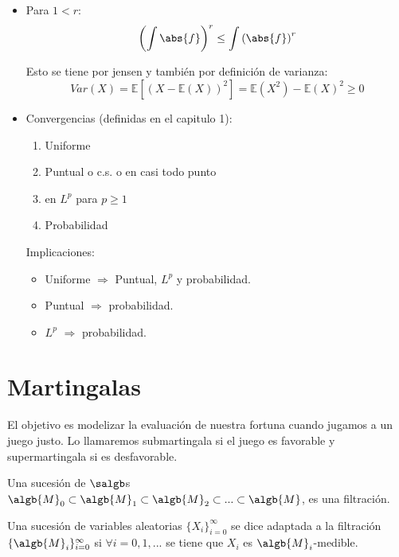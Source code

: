 \documentclass{apuntes}
\begin{document}
\begin{itemize}
\begin{itemize}
\begin{enumerate}
\end{enumerate}


\end{itemize}
\item Para $1<r$:
$$\left(\int \abs{f}\right)^r \leq\int \left( \abs{f} \right)^r$$

Esto se tiene por jensen y también por definición de varianza:
\[
Var(X)=\mathbb{E}[(X-\mathbb{E}(X))^2] = \mathbb{E}(X^2) - \mathbb{E}(X)^2 \geq 0
\]

\item Convergencias (definidas en el capitulo 1):
\begin{enumerate}
\item Uniforme
\item Puntual o c.s. o en casi todo punto
\item en $L^p$ para $p\geq 1$
\item Probabilidad
\end{enumerate}
Implicaciones:
\begin{itemize}
\item Uniforme $\Rightarrow$ Puntual, $L^p$ y probabilidad.
\item Puntual $\Rightarrow$ probabilidad.
\item $L^p$ $\Rightarrow$ probabilidad.
\end{itemize}
\end{itemize}






\chapter{Martingalas}
El objetivo es modelizar la evaluación de nuestra fortuna cuando jugamos a un juego justo. Lo llamaremos submartingala si el juego es favorable y supermartingala si es desfavorable.

\begin{defn}[Filtración]
Una sucesión de $\salgb$s $\algb{M}_0 \subset \algb{M}_1 \subset \algb{M}_2 \subset ... \subset \algb{M}$, es una filtración.
\end{defn}

\begin{defn}
Una sucesión de variables aleatorias $\{X_i\}_{i=0}^{\infty}$ se dice adaptada a la filtración $\{\algb{M}_i\}_{i=0}^{\infty}$ si $\forall i = 0,1,...$ se tiene que $X_i$ es $\algb{M}_i$-medible.
\end{defn}
\end{document}
